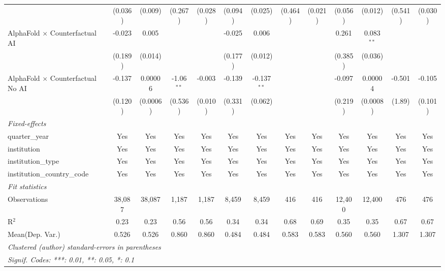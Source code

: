 \begin{tabular}{lcccccccccccc}
                                            & (0.036)      & (0.009)        & (0.267)      & (0.028) & (0.094) & (0.025)       & (0.464) & (0.021)       & (0.056) & (0.012)      & (0.541)      & (0.030)\\   
   AlphaFold $\times$ Counterfactual AI     & -0.023       & 0.005          &              &         & -0.025  & 0.006         &         &               & 0.261   & 0.083$^{**}$ &              &   \\   
                                            & (0.189)      & (0.014)        &              &         & (0.177) & (0.012)       &         &               & (0.385) & (0.036)      &              &   \\   
   AlphaFold $\times$ Counterfactual No AI  & -0.137       & 0.00006        & -1.06$^{**}$ & -0.003  & -0.139  & -0.137$^{**}$ &         &               & -0.097  & 0.00004      & -0.501       & -0.105\\   
                                            & (0.120)      & (0.0006)       & (0.536)      & (0.010) & (0.331) & (0.062)       &         &               & (0.219) & (0.0008)     & (1.89)       & (0.101)\\   
   \midrule
   \emph{Fixed-effects}\\
   quarter\_year                            & Yes          & Yes            & Yes          & Yes     & Yes     & Yes           & Yes     & Yes           & Yes     & Yes          & Yes          & Yes\\  
   institution                              & Yes          & Yes            & Yes          & Yes     & Yes     & Yes           & Yes     & Yes           & Yes     & Yes          & Yes          & Yes\\  
   institution\_type                        & Yes          & Yes            & Yes          & Yes     & Yes     & Yes           & Yes     & Yes           & Yes     & Yes          & Yes          & Yes\\  
   institution\_country\_code               & Yes          & Yes            & Yes          & Yes     & Yes     & Yes           & Yes     & Yes           & Yes     & Yes          & Yes          & Yes\\  
   \midrule
   \emph{Fit statistics}\\
   Observations                             & 38,087       & 38,087         & 1,187        & 1,187   & 8,459   & 8,459         & 416     & 416           & 12,400  & 12,400       & 476          & 476\\  
   R$^2$                                    & 0.23         & 0.23           & 0.56         & 0.56    & 0.34    & 0.34          & 0.68    & 0.69          & 0.35    & 0.35         & 0.67         & 0.67\\  
Mean(Dep. Var.) & 0.526 & 0.526 & 0.860 & 0.860 & 0.484 & 0.484 & 0.583 & 0.583 & 0.560 & 0.560 & 1.307 & 1.307 \\
   \midrule \midrule
   \multicolumn{13}{l}{\emph{Clustered (author) standard-errors in parentheses}}\\
   \multicolumn{13}{l}{\emph{Signif. Codes: ***: 0.01, **: 0.05, *: 0.1}}\\
\end{tabular}
\par\endgroup
